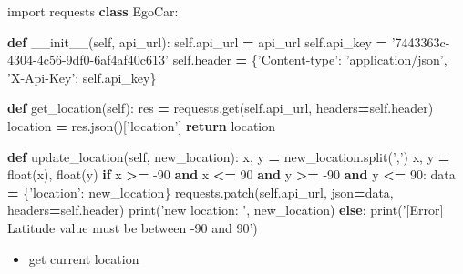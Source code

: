 \documentclass[]{book}
\newenvironment{Shaded}{\begin{snugshade}}{\end{snugshade}}
\newcommand{\BuiltInTok}[1]{#1}
\newcommand{\ControlFlowTok}[1]{\textcolor[rgb]{0.13,0.29,0.53}{\textbf{#1}}}
\newcommand{\DecValTok}[1]{\textcolor[rgb]{0.00,0.00,0.81}{#1}}
\newcommand{\FunctionTok}[1]{\textcolor[rgb]{0.00,0.00,0.00}{#1}}
\newcommand{\ImportTok}[1]{#1}
\newcommand{\KeywordTok}[1]{\textcolor[rgb]{0.13,0.29,0.53}{\textbf{#1}}}
\newcommand{\NormalTok}[1]{#1}
\newcommand{\OperatorTok}[1]{\textcolor[rgb]{0.81,0.36,0.00}{\textbf{#1}}}
\newcommand{\StringTok}[1]{\textcolor[rgb]{0.31,0.60,0.02}{#1}}
\newcommand{\VariableTok}[1]{\textcolor[rgb]{0.00,0.00,0.00}{#1}}
\providecommand{\tightlist}{%
  \setlength{\itemsep}{0pt}\setlength{\parskip}{0pt}}
\begin{document}
\begin{Shaded}
\begin{Highlighting}[]
\ImportTok{import}\NormalTok{ requests}
\KeywordTok{class}\NormalTok{ EgoCar:}
    
    \KeywordTok{def} \FunctionTok{__init__}\NormalTok{(}\VariableTok{self}\NormalTok{, api_url):}
        \VariableTok{self}\NormalTok{.api_url }\OperatorTok{=}\NormalTok{ api_url}
        \VariableTok{self}\NormalTok{.api_key }\OperatorTok{=} \StringTok{'7443363c-4304-4c56-9df0-6af4af40c613'}
        \VariableTok{self}\NormalTok{.header }\OperatorTok{=}\NormalTok{ \{}\StringTok{'Content-type'}\NormalTok{: }\StringTok{'application/json'}\NormalTok{, }\StringTok{'X-Api-Key'}\NormalTok{: }\VariableTok{self}\NormalTok{.api_key\}}
        
    \KeywordTok{def}\NormalTok{ get_location(}\VariableTok{self}\NormalTok{):}
\NormalTok{        res }\OperatorTok{=}\NormalTok{ requests.get(}\VariableTok{self}\NormalTok{.api_url, headers}\OperatorTok{=}\VariableTok{self}\NormalTok{.header)}
\NormalTok{        location }\OperatorTok{=}\NormalTok{ res.json()[}\StringTok{'location'}\NormalTok{]}
        \ControlFlowTok{return}\NormalTok{ location}
    
    \KeywordTok{def}\NormalTok{ update_location(}\VariableTok{self}\NormalTok{, new_location):}
\NormalTok{        x, y }\OperatorTok{=}\NormalTok{ new_location.split(}\StringTok{','}\NormalTok{)}
\NormalTok{        x, y }\OperatorTok{=} \BuiltInTok{float}\NormalTok{(x), }\BuiltInTok{float}\NormalTok{(y)}
        \ControlFlowTok{if}\NormalTok{ x }\OperatorTok{>=} \DecValTok{-90} \KeywordTok{and}\NormalTok{ x }\OperatorTok{<=} \DecValTok{90} \KeywordTok{and}\NormalTok{ y }\OperatorTok{>=} \DecValTok{-90} \KeywordTok{and}\NormalTok{ y }\OperatorTok{<=} \DecValTok{90}\NormalTok{:}
\NormalTok{            data }\OperatorTok{=}\NormalTok{ \{}\StringTok{'location'}\NormalTok{: new_location\}}
\NormalTok{            requests.patch(}\VariableTok{self}\NormalTok{.api_url, json}\OperatorTok{=}\NormalTok{data, headers}\OperatorTok{=}\VariableTok{self}\NormalTok{.header)}
            \BuiltInTok{print}\NormalTok{(}\StringTok{'new location: '}\NormalTok{, new_location)}
        \ControlFlowTok{else}\NormalTok{:}
            \BuiltInTok{print}\NormalTok{(}\StringTok{'[Error] Latitude value must be between -90 and 90'}\NormalTok{)}
\end{Highlighting}
\end{Shaded}

\begin{itemize}
\tightlist
\item
  get current location
\end{itemize}
\end{document}
